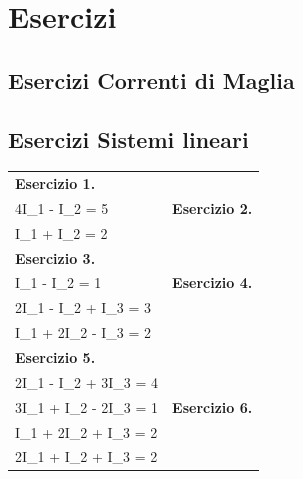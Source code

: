\chapter{Esercizi}
\section{Esercizi Correnti di Maglia}

\newpage
\section{Esercizi Sistemi lineari}

\newcommand{\esercizio}[2]{%
  \textbf{Esercizio #1\label{ex:#1}.} #2
}

\noindent
\begin{tabular}{p{}p{}}

\esercizio{1}{\[
\begin{cases}
2I_1 + 3I_2 = 7 \\
4I_1 - I_2 = 5
\end{cases}
\]}
&
\esercizio{2}{\[
\begin{cases}
\dfrac{1}{2}I_1 - \dfrac{2}{3}I_2 = 1 \\[6pt]
\dfrac{3}{4}I_1 + I_2 = 2
\end{cases}
\]}
\\ \hline

\esercizio{3}{\[
\begin{cases}
3I_1 + 2I_2 = 8 \\
I_1 - I_2 = 1
\end{cases}
\]}
&
\esercizio{4}{\[
\begin{cases}
I_1 + I_2 + I_3 = 6 \\
2I_1 - I_2 + I_3 = 3 \\
I_1 + 2I_2 - I_3 = 2
\end{cases}
\]}
\\ \hline

\esercizio{5}{\[
\begin{cases}
I_1 + 2I_2 - I_3 = 3 \\
2I_1 - I_2 + 3I_3 = 4 \\
3I_1 + I_2 - 2I_3 = 1
\end{cases}
\]}
&
\esercizio{6}{\[
\begin{cases}
I_1 + I_2 + 2I_3 = 2 \\
I_1 + 2I_2 + I_3 = 2 \\
2I_1 + I_2 + I_3 = 2
\end{cases}
\]}
\\ \hline


\end{tabular}
